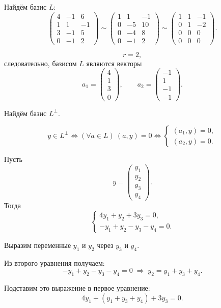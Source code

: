 Найдём базис $L$:
\[
\begin{pmatrix}
4 & -1 & 6\\
1 & 1 & -1\\
3 & -1 & 5\\
0 & -1 & 2
\end{pmatrix}
\sim
\begin{pmatrix}
1 & 1 & -1\\
0 & -5 & 10\\
0 & -4 & 8\\
0 & -1 & 2
\end{pmatrix}
\sim
\begin{pmatrix}
1 & 1 & -1\\
0 & 1 & -2\\
0 & 0 & 0\\
0 & 0 & 0
\end{pmatrix}.
\]

\[
r=2,
\]
следовательно, базисом $L$ являются векторы
\[
a_1=
\begin{pmatrix}
4\\
1\\
3\\
0
\end{pmatrix},
\qquad
a_2=
\begin{pmatrix}
-1\\
1\\
-1\\
-1
\end{pmatrix}.
\]

Найдём базис $L^\perp$.

\[
y\in L^\perp
\iff
(\forall a\in L)\ (a,y)=0
\iff
\begin{cases}
(a_1,y)=0,\\
(a_2,y)=0.
\end{cases}
\]

Пусть
\[
y=
\begin{pmatrix}
y_1\\
y_2\\
y_3\\
y_4
\end{pmatrix}.
\]
Тогда
\[
\begin{cases}
4y_1+y_2+3y_3=0,\\
-y_1+y_2-y_3-y_4=0.
\end{cases}
\]

Выразим переменные $y_1$ и $y_2$ через $y_3$ и $y_4$.

Из второго уравнения получаем:
\[
-y_1+y_2-y_3-y_4=0
\;\Rightarrow\;
y_2=y_1+y_3+y_4.
\]

Подставим это выражение в первое уравнение:
\[
4y_1+(y_1+y_3+y_4)+3y_3=0.
\]

